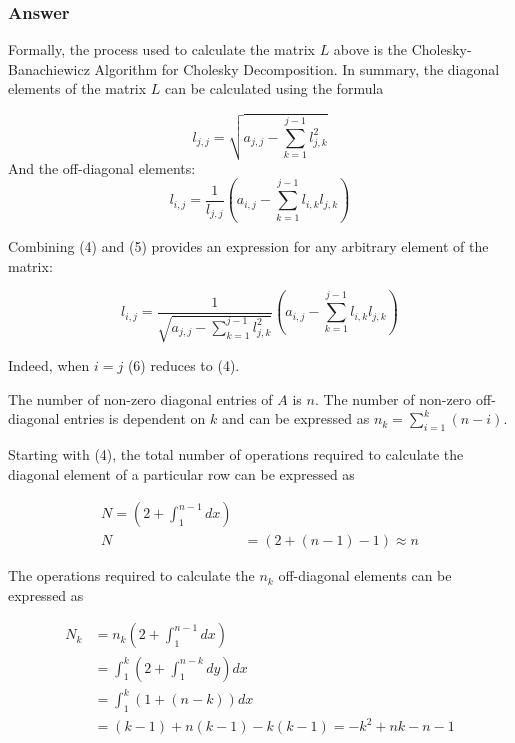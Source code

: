 \documentclass{article}
\newcommand{\n}{\newline}
\begin{document}
		\subsubsection{Answer}
		
		Formally, the process used to calculate the matrix $L$ above is the Cholesky-Banachiewicz Algorithm for Cholesky Decomposition\cite{CD}.  In summary, the diagonal elements of the matrix $L$ can be calculated using the formula
		
		\begin{equation}
			l_{j,j}=\sqrt{a_{j,j}-\sum_{k=1}^{j-1}l_{j,k}^2}
		\end{equation}
		And the off-diagonal elements:
		\begin{equation}
			l_{i,j}=\frac{1}{l_{j,j}}(a_{i,j}-\sum_{k=1}^{j-1}l_{i,k}l_{j,k})
		\end{equation}
		
		Combining (4) and (5) provides an expression for any arbitrary element of the matrix:
		
		\begin{equation}
		l_{i,j}=\frac{1}{\sqrt{a_{j,j}-\sum_{k=1}^{j-1}l_{j,k}^2}}(a_{i,j}-\sum_{k=1}^{j-1}l_{i,k}l_{j,k})
		\end{equation}
		
		Indeed, when $i=j$ (6) reduces to (4).  \n
		
		The number of non-zero diagonal entries of $A$ is $n$.  The number of non-zero off-diagonal entries is dependent on $k$ and can be expressed as $n_{k}=\sum_{i=1}^{k}(n-i)$.  \n
		
		Starting with (4), the total number of operations required to calculate the diagonal element of a particular row can be expressed as 
		
		\begin{align*}
			N=(2+\int_{1}^{n-1}dx)\\
			N&=(2+(n-1)-1)\approx n
		\end{align*}		
		
		The operations required to calculate the $n_{k}$ off-diagonal elements can be expressed as
		
		\begin{align*}
			N_{k}&=n_{k}(2+\int_{1}^{n-1}dx)\\
			&=\int_{1}^{k}(2+\int_{1}^{n-k}dy)dx\\
			&=\int_{1}^{k}(1+(n-k))dx\\
			&=(k-1)+n(k-1)-k(k-1)=-k^{2}+nk-n-1
			\end{align*}
		
\end{document}
